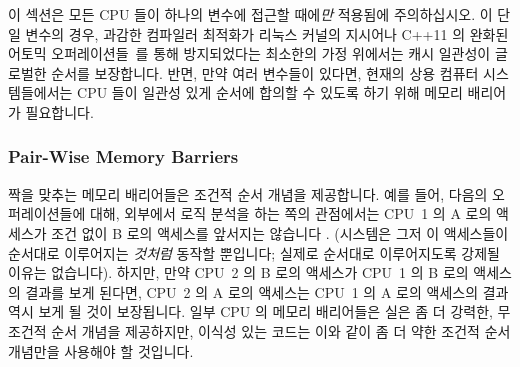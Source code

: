 이 섹션은 모든 CPU 들이 하나의 변수에 접근할 때에\emph{만} 적용됨에
주의하십시오.
이 단일 변수의 경우, 과감한 컴파일러 최적화가 리눅스 커널의 
지시어나 C++11 의 완화된 어토믹 오퍼레이션들~\cite{PeteBecker2011N3242}를 통해
방지되었다는 최소한의 가정 위에서는 캐시 일관성이 글로벌한 순서를 보장합니다.
반면, 만약 여러 변수들이 있다면, 현재의 상용 컴퓨터 시스템들에서는 CPU 들이
일관성 있게 순서에 합의할 수 있도록 하기 위해 메모리 배리어가 필요합니다.

\subsubsection{Pair-Wise Memory Barriers}

짝을 맞추는 메모리 배리어들은 조건적 순서 개념을 제공합니다.
예를 들어, 다음의 오퍼레이션들에 대해, 외부에서 로직 분석을 하는 쪽의
관점에서는 CPU~1 의 A 로의 액세스가 조건 없이 B 로의 액세스를 앞서지는 않습니다
.
	  {(시스템은 그저 이 액세스들이 순서대로 이루어지는 \emph{것처럼}
	  동작할 뿐입니다; 실제로 순서대로 이루어지도록 강제될 이유는
	  없습니다).}
하지만, 만약 CPU~2 의 B 로의 액세스가 CPU~1 의 B 로의 액세스의 결과를 보게
된다면, CPU~2 의 A 로의 액세스는 CPU~1 의 A 로의 액세스의 결과 역시 보게 될
것이 보장됩니다.
일부 CPU 의 메모리 배리어들은 실은 좀 더 강력한, 무조건적 순서 개념을
제공하지만, 이식성 있는 코드는 이와 같이 좀 더 약한 조건적 순서 개념만을
사용해야 할 것입니다.

